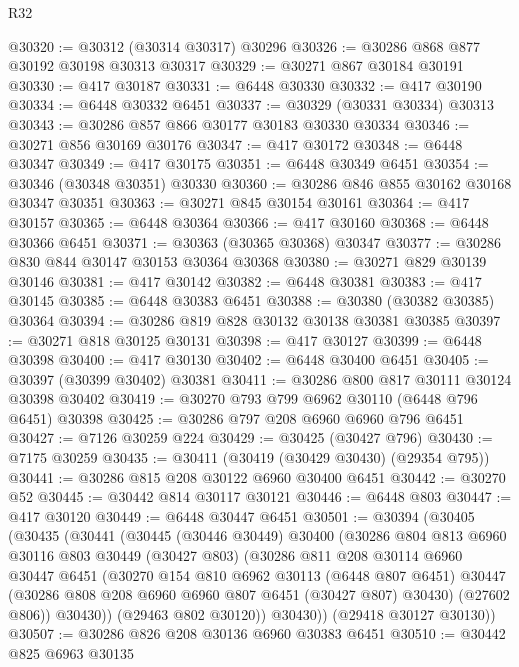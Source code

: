 \begin{lexlean}{R32}
\begin{coremodule}
@30320 := @30312 (@30314 @30317) @30296
@30326 := @30286 @868 @877 @30192 @30198 @30313 @30317
@30329 := @30271 @867 @30184 @30191
@30330 := @417 @30187
@30331 := @6448 @30330
@30332 := @417 @30190
@30334 := @6448 @30332 @6451
@30337 := @30329 (@30331 @30334) @30313
@30343 := @30286 @857 @866 @30177 @30183 @30330 @30334
@30346 := @30271 @856 @30169 @30176
@30347 := @417 @30172
@30348 := @6448 @30347
@30349 := @417 @30175
@30351 := @6448 @30349 @6451
@30354 := @30346 (@30348 @30351) @30330
@30360 := @30286 @846 @855 @30162 @30168 @30347 @30351
@30363 := @30271 @845 @30154 @30161
@30364 := @417 @30157
@30365 := @6448 @30364
@30366 := @417 @30160
@30368 := @6448 @30366 @6451
@30371 := @30363 (@30365 @30368) @30347
@30377 := @30286 @830 @844 @30147 @30153 @30364 @30368
@30380 := @30271 @829 @30139 @30146
@30381 := @417 @30142
@30382 := @6448 @30381
@30383 := @417 @30145
@30385 := @6448 @30383 @6451
@30388 := @30380 (@30382 @30385) @30364
@30394 := @30286 @819 @828 @30132 @30138 @30381 @30385
@30397 := @30271 @818 @30125 @30131
@30398 := @417 @30127
@30399 := @6448 @30398
@30400 := @417 @30130
@30402 := @6448 @30400 @6451
@30405 := @30397 (@30399 @30402) @30381
@30411 := @30286 @800 @817 @30111 @30124 @30398 @30402
@30419 := @30270 @793 @799 @6962 @30110 (@6448 @796 @6451) @30398
@30425 := @30286 @797 @208 @6960 @6960 @796 @6451
@30427 := @7126 @30259 @224
@30429 := @30425 (@30427 @796)
@30430 := @7175 @30259
@30435 := @30411 (@30419 (@30429 @30430) (@29354 @795))
@30441 := @30286 @815 @208 @30122 @6960 @30400 @6451
@30442 := @30270 @52
@30445 := @30442 @814 @30117 @30121
@30446 := @6448 @803
@30447 := @417 @30120
@30449 := @6448 @30447 @6451
@30501 := @30394
    (@30405
      (@30435
        (@30441
          (@30445
            (@30446 @30449)
            @30400
            (@30286
              @804
              @813
              @6960
              @30116
              @803
              @30449
              (@30427 @803)
              (@30286
                @811
                @208
                @30114
                @6960
                @30447
                @6451
                (@30270
                  @154
                  @810
                  @6962
                  @30113
                  (@6448 @807 @6451)
                  @30447
                  (@30286 @808 @208 @6960 @6960 @807 @6451 (@30427 @807) @30430)
                  (@27602 @806))
                @30430))
            (@29463 @802 @30120))
          @30430))
      (@29418 @30127 @30130))
@30507 := @30286 @826 @208 @30136 @6960 @30383 @6451
@30510 := @30442 @825 @6963 @30135

\end{coremodule}
\end{lexlean}
